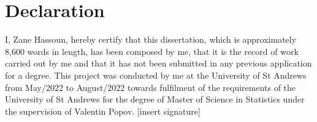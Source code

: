 \cleardoublepage


\chapter*{Declaration}

 I, Zane Hassoun, hereby certify that this dissertation, which is approximately 8,600 words in length, has been composed by me, that it is the record of work carried out by me and that it has not been submitted in any previous application for a degree. This project was conducted by me at the University of St Andrews from May/2022 to August/2022 towards fulfilment of the requirements of the University of St Andrews for the degree of Master of Science in Statistics under the supervision of Valentin Popov. [insert signature]

